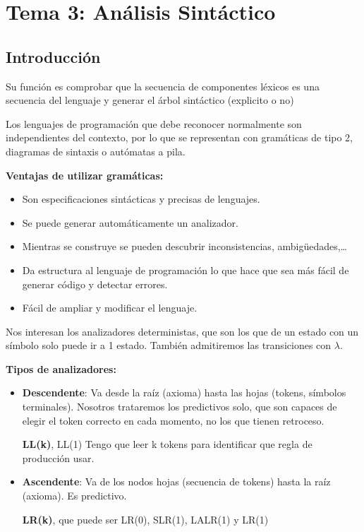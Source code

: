 \documentclass[12pt, twoside, openright]{report} %
\begin{document}
\chapter{Tema 3: Análisis Sintáctico}


\section{Introducción}

Su función es comprobar que la secuencia de componentes léxicos es una
secuencia del lenguaje y generar el árbol sintáctico (explicito o no)

Los lenguajes de programación que debe reconocer normalmente son
independientes del contexto, por lo que se representan con gramáticas de
tipo 2, diagramas de sintaxis o autómatas a pila.

\textbf{Ventajas de utilizar gramáticas:}

\begin{itemize}
	\item Son especificaciones sintácticas y precisas de lenguajes.
	\item Se puede generar automáticamente un analizador.
	\item Mientras se construye se pueden descubrir inconsistencias,
	      ambigüedades,\ldots{}
	\item Da estructura al lenguaje de programación lo que hace que sea más
	      fácil de generar código y detectar errores.
	\item Fácil de ampliar y modificar el lenguaje.
\end{itemize}

Nos interesan los analizadores deterministas, que son los que de un
estado con un símbolo solo puede ir a 1 estado. También admitiremos las
transiciones con \(\lambda\).

\textbf{Tipos de analizadores:}

\begin{itemize}
	\item \textbf{Descendente}: Va desde la raíz (axioma) hasta las hojas
	      (tokens, símbolos terminales). Nosotros trataremos los predictivos
	      solo, que son capaces de elegir el token correcto en cada momento, no
	      los que tienen retroceso.

	      \textbf{LL(k)}, LL(1) Tengo que leer k tokens para identificar que
	      regla de producción usar.
	\item \textbf{Ascendente}: Va de los nodos hojas (secuencia de tokens) hasta
	      la raíz (axioma). Es predictivo.

	      \textbf{LR(k)}, que puede ser LR(0), SLR(1), LALR(1) y LR(1)
\end{itemize}
\end{document}
